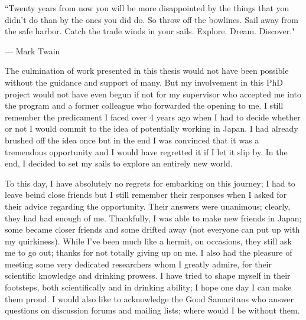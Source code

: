 \epigraph{``Twenty years from now you will be more disappointed by the things that you didn't do than by the ones you did do. So throw off the bowlines. Sail away from the safe harbor. Catch the trade winds in your sails. Explore. Dream. Discover."}{--- \textup{Mark Twain}}

The culmination of work presented in this thesis would not have been possible without the guidance and support of many. But my involvement in this PhD project would not have even begun if not for my supervisor who accepted me into the program and a former colleague who forwarded the opening to me. I still remember the predicament I faced over 4 years ago when I had to decide whether or not I would commit to the idea of potentially working in Japan. I had already brushed off the idea once but in the end I was convinced that it was a tremendous opportunity and I would have regretted it if I let it slip by. In the end, I decided to set my sails to explore an entirely new world.

To this day, I have absolutely no regrets for embarking on this journey; I had to leave beind close friends but I still remember their responses when I asked for their advice regarding the opportunity. Their answers were unanimous; clearly, they had had enough of me. Thankfully, I was able to make new friends in Japan; some became closer friends and some drifted away (not everyone can put up with my quirkiness). While I've been much like a hermit, on occasions, they still ask me to go out; thanks for not totally giving up on me. I also had the pleasure of meeting some very dedicated researchers whom I greatly admire, for their scientific knowledge and drinking prowess. I have tried to shape myself in their footsteps, both scientifically and in drinking ability; I hope one day I can make them proud. I would also like to acknowledge the Good Samaritans who answer questions on discussion forums and mailing lists; where would I be without them.
